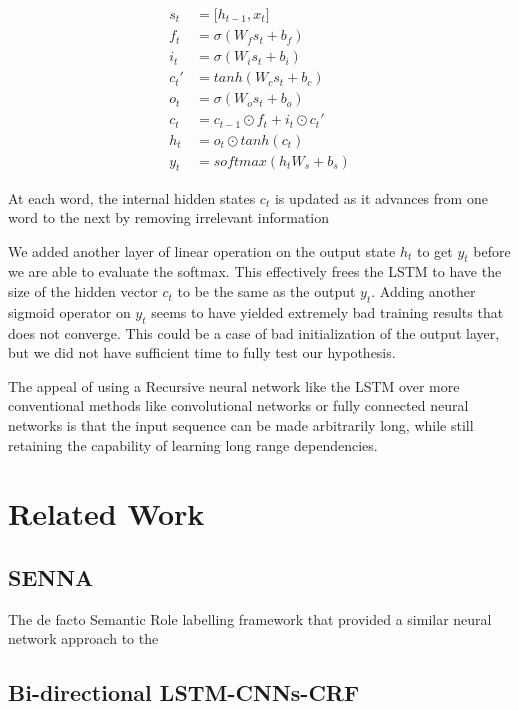 \documentclass[fyp]{socreport}
\begin{document}
\begin{align*}
  s_t &= \lbrack h_{t-1}, x_{t} \rbrack \\
  f_t &= \sigma \left( W_f s_t + b_f \right) \\
  i_t &= \sigma \left( W_i s_t + b_i \right) \\
  c_t' &= tanh \left( W_c s_t + b_c \right) \\
  o_t &= \sigma \left( W_o s_t + b_o \right) \\
  c_t &= c_{t-1} \odot f_t + i_t \odot c_t' \\
  h_t &= o_t \odot tanh \left( c_t \right) \\
  y_t &= softmax \left( h_t W_s + b_s \right)
\end{align*}

At each word, the internal hidden states $c_t$ is updated as it advances from
one word to the next by removing irrelevant information


We added another layer of linear operation on the output state $h_t$ to get
$y_t$ before we are able to evaluate the softmax. This effectively frees the
LSTM to have the size of the hidden vector $c_t$ to be the same as the output
$y_t$. Adding another sigmoid operator on $y_t$ seems to have yielded extremely
bad training results that does not converge. This could be a case of bad
initialization of the output layer, but we did not have sufficient time to
fully test our hypothesis.

The appeal of using a Recursive neural network like the LSTM over more
conventional methods like convolutional networks or fully connected neural
networks is that the input sequence can be made arbitrarily long, while still
retaining the capability of learning long range dependencies.


\chapter{Related Work}
\section{SENNA}
The de facto Semantic Role labelling framework that provided a similar
neural network approach to the \cite{DBLP2011Collobert}

\section{Bi-directional LSTM-CNNs-CRF}
\end{document}

